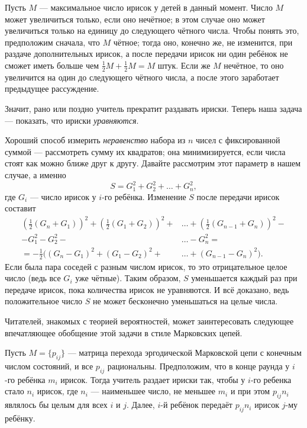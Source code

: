 Пусть $M$ --- максимальное число ирисок у детей в данный момент.
Число $M$ может увеличиться только, если оно нечётное;
в этом случае оно может увеличиться только на единицу до следующего чётного числа.
Чтобы понять это, предположим сначала, что $M$ чётное; тогда оно, конечно же, не изменится, при раздаче дополнительных ирисок, а после передачи ирисок ни один ребёнок не сможет иметь больше чем $\tfrac12 M + \tfrac12 M = M$ штук.
Если же $M$ нечётное, то оно увеличится на один до следующего чётного числа, а после этого заработает предыдущее рассуждение.

Значит, рано или поздно учитель прекратит раздавать ириски.
Теперь наша задача --- показать, что ириски \emph{уравняются}.

Хороший способ измерить \emph{неравенство} набора из $n$ чисел с фиксированной суммой --- рассмотреть сумму их квадратов; она минимизируется, если числа стоят как можно ближе друг к другу.
Давайте рассмотрим этот параметр в нашем случае, а именно 
\[S = G^2_1 + G^2_2 + \dots + G^2_n,\]
где $G_i$ --- число ирисок у $i$-го ребёнка.
Изменение $S$ после передачи ирисок составит
\begin{align*}
\left(\tfrac{1}{2}(G_n+G_1)\right)^2+\left(\tfrac{1}{2}(G_1+G_2)\right)^2+&\dots+\left(\tfrac{1}{2}(G_{n-1}+G_n)\right)^2-
\\
-G_1^2-G_2^2-&\dots-G_n^2=
\\
=-\tfrac12\bigl((G_n-G_1)^2+(G_1-G_2)^2+&\dots+(G_{n-1}-G_n)^2\bigr).
\end{align*}
Если была пара соседей с разным числом ирисок, то это отрицательное целое число (ведь все $G_i$ уже чётные).
Таким образом, $S$ уменьшается каждый раз при передаче ирисок, пока количества ирисок не уравняются.
И всё доказано, ведь положительное число $S$ не может бесконечно уменьшаться на целые числа.

\medskip

Читателей, знакомых с теорией вероятностей, может заинтересовать следующее впечатляющее обобщение этой задачи в стиле Марковских цепей.

Пусть $M=\{p_{ij}\}$ --- матрица перехода эргодической Марковской цепи с конечным числом состояний, и все $p_{ij}$ рациональны.
Предположим, что в конце раунда у $i$-го ребёнка $m_i$ ирисок.
Тогда учитель раздает ириски так, чтобы у $i$-го ребенка стало $n_i$ ирисок, где $n_i$ --- наименьшее число, не меньшее  $m_i$ и при этом $p_{ij}n_i$ являлось бы целым для всех $i$ и $j$.
Далее, $i$-й ребёнок передаёт $p_{ij}n_i$ ирисок $j$-му ребёнку.

